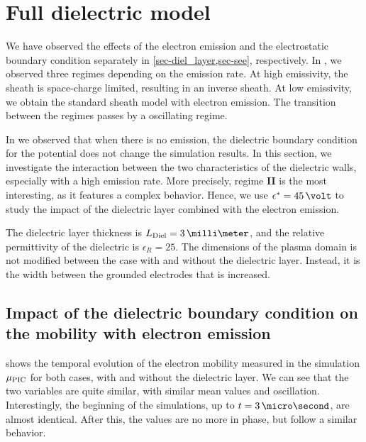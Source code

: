 
\section{Full dielectric model }
  \label{sec-fulldiel}
  
  We have observed the effects of the electron emission and the electrostatic boundary condition separately in \cref{sec-diel_layer,sec-see}, respectively.  
  In , we observed three regimes depending on the emission rate.
  At high emissivity, the sheath is space-charge limited, resulting in an inverse sheath.
  At low emissivity, we obtain the standard sheath model with electron emission.
  The transition between the regimes passes by a oscillating regime.
  
  In  we observed that when there is no emission, the dielectric boundary condition for the potential does not change the simulation results.
  In this section, we investigate the interaction between the two characteristics of the dielectric walls, especially with a high emission rate.
  More precisely, regime {\bf II} is the most interesting, as it features a complex behavior.
  Hence, we use $\crover=45\,\volt$ to study the impact of the dielectric layer combined with the electron emission.
  
  The dielectric layer thickness is $L_{\rm Diel} = 3\,\milli\meter$, and the relative permittivity of the dielectric is $\epsilon_R=25$.
  The dimensions of the plasma domain is not modified between the case with and without the dielectric layer.
  Instead, it is the width between the grounded electrodes that is increased.
  
  \subsection{Impact of the dielectric boundary condition on the mobility with electron emission}
    
     shows the temporal evolution of the electron mobility measured in the simulation $\mu_{\mathrm{PIC}}$ for both cases, with and without the dielectric layer.
    We can see that the two variables are quite similar, with similar mean values and oscillation.
    Interestingly, the beginning of the simulations, up to $t=3\,\micro\second$, are almost identical.
    After this, the values are no more in phase, but follow a similar behavior.
    

